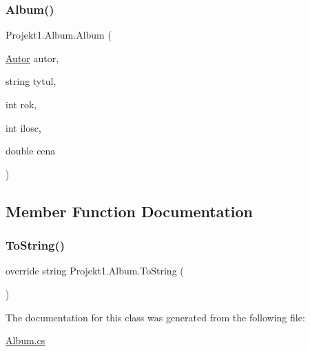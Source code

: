 \subsubsection{\texorpdfstring{Album()}{Album()}}
{\footnotesize\ttfamily Projekt1.\+Album.\+Album (\begin{DoxyParamCaption}\item[{\mbox{\hyperlink{class_projekt1_1_1_autor}{Autor}}}]{autor,  }\item[{string}]{tytul,  }\item[{int}]{rok,  }\item[{int}]{ilosc,  }\item[{double}]{cena }\end{DoxyParamCaption})}



\subsection{Member Function Documentation}
\mbox{\label{class_projekt1_1_1_album_a5e93d9b6fc14969f45e073f3b2e9dae5}} 
\subsubsection{\texorpdfstring{ToString()}{ToString()}}
{\footnotesize\ttfamily override string Projekt1.\+Album.\+To\+String (\begin{DoxyParamCaption}{ }\end{DoxyParamCaption})}



The documentation for this class was generated from the following file\+:\begin{DoxyCompactItemize}
\item 
\mbox{\hyperlink{_album_8cs}{Album.\+cs}}\end{DoxyCompactItemize}

